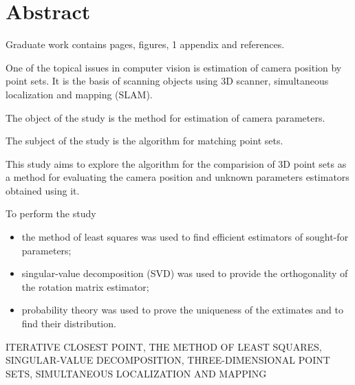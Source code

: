 \chapter*{Abstract}

Graduate work contains \pageref{LastPage} pages,
 figures, 1 appendix and
 references.

One of the topical issues in computer vision is estimation of camera position by
point sets.
It is the basis of scanning objects using 3D scanner,
simultaneous localization and mapping (SLAM).

The object of the study is the method for estimation of camera parameters.

The subject of the study is the algorithm for matching point sets.

This study aims to explore the algorithm for the comparision of 3D point sets
as a method for evaluating the camera position and unknown parameters estimators
obtained using it.

To perform the study
\begin{itemize}
  \item the method of least squares was used to find efficient estimators of
  sought-for parameters;
  \item singular-value decomposition (SVD) was used to provide the orthogonality
  of the rotation matrix estimator;
  \item probability theory was used to prove the uniqueness of the extimates and
  to find their distribution.
\end{itemize}

\MakeUppercase{iterative closest point, the method of least squares,
singular-value decomposition, three-dimensional point sets,
simultaneous localization and mapping}
